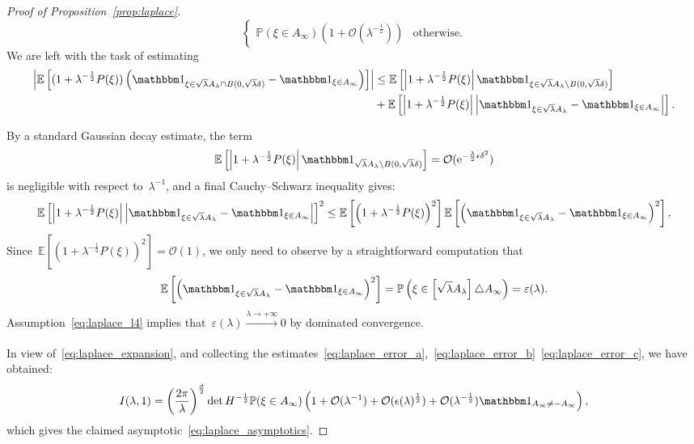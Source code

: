 \documentclass[10pt]{article}
\newcommand{\e}{\mathrm{e}}
\newcommand{\E}{\mathbb{E}}
\renewcommand{\P}{\mathbb{P}}
\newcommand{\1}{\mathbbm 1}
\renewcommand{\O}{\mathcal{O}}
\begin{document}
\begin{proof}[Proof of Proposition~\ref{prop:laplace}]
\begin{equation}
\begin{cases}
                    \P(\xi\in A_\infty)\left(1+\O(\lambda^{-\frac12})\right)&\text{otherwise.}
                \end{cases}
            \end{equation}
            We are left with the task of estimating
            \begin{equation}
                \begin{aligned}
                    \left|\E\left[(1+\lambda^{-\frac12}P(\xi))\left(\1_{\xi\in\sqrt\lambda A_\lambda \cap B(0,\sqrt\lambda\delta)}-\1_{\xi\in A_\infty}\right)\right]\right| &\leq \E\left[\left|1 + \lambda^{-\frac12}P(\xi)\right|\1_{\xi\in\sqrt\lambda A_\lambda \setminus B(0,\sqrt\lambda\delta)}\right]\\
                    &+ \E\left[\left|1 + \lambda^{-\frac12}P(\xi)\right|\left|\1_{\xi \in \sqrt\lambda A_\lambda}-\1_{\xi \in A_\infty}\right|\right].
                \end{aligned}
            \end{equation}

            By a standard Gaussian decay estimate, the term
            \[ \E\left[\left|1 + \lambda^{-\frac12}P(\xi)\right|\1_{\sqrt\lambda A_\lambda \setminus B(0,\sqrt\lambda\delta)}\right] = \O(\e^{-\frac{\lambda}2\epsilon \delta^2})\]
            is negligible with respect to~$\lambda^{-1}$, and a final Cauchy--Schwarz inequality gives:
            \[\E\left[\left|1 + \lambda^{-\frac12}P(\xi)\right|\left|\1_{\xi\in\sqrt\lambda A_\lambda}-\1_{\xi \in A_\infty}\right|\right]^2 \leq \E\left[\left(1 + \lambda^{-\frac12}P(\xi)\right)^2\right]\E\left[\left(\1_{\xi\in\sqrt\lambda A_\lambda}-\1_{\xi \in A_\infty}\right)^2\right].\]
            Since~$\E\left[\left(1 + \lambda^{-\frac12}P(\xi)\right)^2\right] = \O(1)$, we only need to observe by a straightforward computation that
            \begin{equation}
                \label{eq:laplace_error_c}
                \E\left[\left(\1_{\xi\in\sqrt\lambda A_\lambda}-\1_{\xi \in A_\infty}\right)^2\right] = \P\left(\xi \in \left[\sqrt\lambda A_\lambda\right]\triangle A_\infty\right) = \varepsilon(\lambda).
            \end{equation}
            Assumption~\eqref{eq:laplace_l4} implies that~$\varepsilon(\lambda) \xrightarrow[]{\lambda \to +\infty} 0$ by dominated convergence.
        
            In view of~\eqref{eq:laplace_expansion}, and collecting the estimates~\eqref{eq:laplace_error_a},~\eqref{eq:laplace_error_b}~\eqref{eq:laplace_error_c}, we have obtained:
            \begin{equation}
                I(\lambda,1) = \left(\frac{2\pi}{\lambda}\right)^{\frac d2}\det H^{-\frac12}\P(\xi \in A_\infty)\left(1+\O(\lambda^{-1})+\O(\epsilon(\lambda)^{\frac12})+ \O(\lambda^{-\frac 12})\1_{A_\infty \neq - A_\infty}\right),
            \end{equation}
            which gives the claimed asymptotic~\eqref{eq:laplace_asymptotics}.
        \end{proof}
\end{document}
